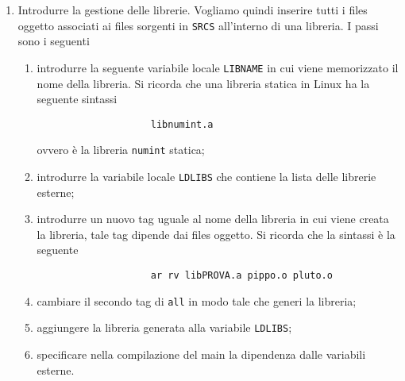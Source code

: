 \begin{enumerate}
        \item Introdurre la gestione delle librerie. Vogliamo quindi inserire tutti i files oggetto associati ai files sorgenti in \texttt{SRCS} all'interno di una libreria. I passi sono i seguenti
        \begin{enumerate}
            \item introdurre la seguente variabile locale \texttt{LIBNAME} in cui viene memorizzato il nome della libreria. Si ricorda che una libreria statica in Linux ha la seguente sintassi
                \begin{verbatim}
                    libnumint.a
                \end{verbatim}
                ovvero \`e la libreria \texttt{numint} statica;
            \item introdurre la variabile locale \texttt{LDLIBS} che contiene la lista delle librerie esterne;
            \item introdurre un nuovo tag uguale al nome della libreria in cui viene creata la libreria, tale tag dipende dai files oggetto. Si ricorda che la sintassi \`e la seguente
                \begin{verbatim}
                    ar rv libPROVA.a pippo.o pluto.o
                \end{verbatim}
            \item cambiare il secondo tag di \texttt{all} in modo tale che generi la libreria;
            \item aggiungere la libreria generata alla variabile \texttt{LDLIBS};
            \item specificare nella compilazione del main la dipendenza dalle variabili esterne.
        \end{enumerate}
\end{enumerate}



